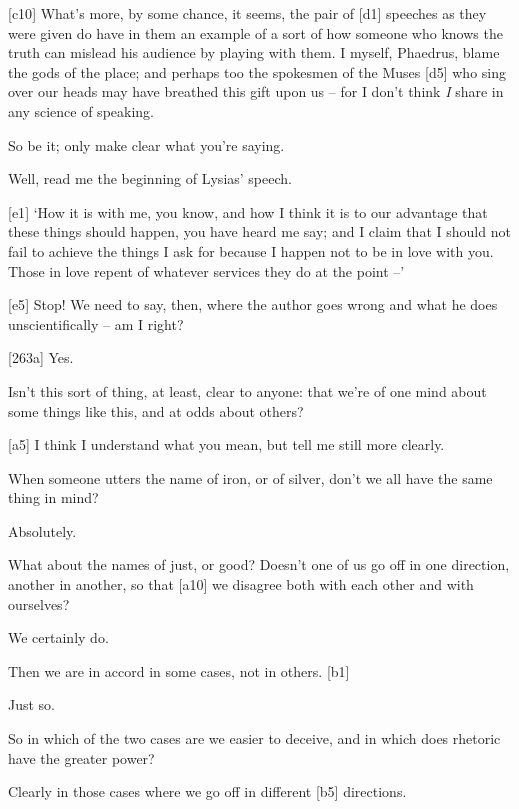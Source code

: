 {[}c10{]}  What's more, by some chance, it seems, the pair of
{[}d1{]} speeches as
they were given do have in them an example of a sort of how someone who
knows the truth can mislead his audience by playing with
them. I myself,
Phaedrus, blame the gods of the place; and perhaps too the spokesmen of
the Muses {[}d5{]} who sing over our heads may have breathed this gift
upon us -- for I don't think {\em I} share in any science of speaking.

 So be it; only make clear what you're saying.

 Well, read me the beginning of Lysias' speech.

{[}e1{]}  ‘How it is with me, you know, and how I think it is to
our advantage that these things should happen, you have heard me say;
and I claim that I should not fail to achieve the things I ask for
because I happen not to be in love with you. Those in love repent of
whatever services they do at the point --'

{[}e5{]}  Stop! We need to say, then, where the author goes
wrong and what he does unscientifically -- am I right?

{[}263a{]}  Yes.

 Isn't this sort of thing, at least, clear to anyone: that we're
of one mind about some things like this, and at odds about others?

{[}a5{]}  I think I understand what you mean, but tell me still
more clearly.

 When someone utters the name of iron, or of silver, don't we
all have the same thing in mind?

 Absolutely.

 What about the names of just, or
good? Doesn't one of us
go off in one direction, another in another, so that {[}a10{]} we
disagree both with each other and with ourselves?

 We certainly do.

 Then we are in accord in some cases, not in others. {[}b1{]}

 Just so.

 So in which of the two cases are we easier to deceive, and in
which does rhetoric have the greater power?

 Clearly in those cases where we go off in different {[}b5{]}
directions.

